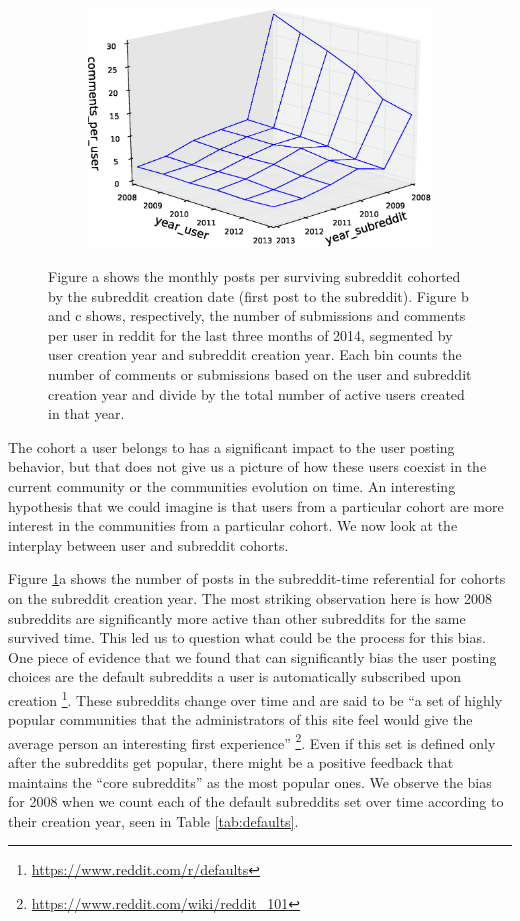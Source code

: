 \begin{figure}[!tb]
\begin{subfigure}{.3\textwidth}\includegraphics[scale=0.285]{./images/user_subreddit_comments_cohorts.eps}\caption{}\end{subfigure}
\caption{Figure a shows the monthly posts per surviving subreddit cohorted by the subreddit creation date (first post to the subreddit). Figure b and c shows, respectively, the number of submissions and comments per user in reddit for the last three months of 2014, segmented by user creation year and subreddit creation year. Each bin counts the number of comments or submissions based on the user and subreddit creation year and divide by the total number of active users created in that year.}
\label{fig:joint}
\end{figure}

The cohort a user belongs to has a significant impact to the user posting behavior, but that does not give us a picture of how these users coexist in the current community or the communities evolution on time. An interesting hypothesis that we could imagine is that users from a particular cohort are more interest in the communities from a particular cohort. We now look at the interplay between user and subreddit cohorts. 

Figure \ref{fig:joint}a shows the number of posts in the subreddit-time referential for cohorts on the subreddit creation year. The most striking observation here is how 2008 subreddits are significantly more active than other subreddits for the same survived time. This led us to question what could be the process for this bias. One piece of evidence that we found that can significantly bias the user posting choices are the default subreddits a user is automatically subscribed upon creation \footnote{\url{https://www.reddit.com/r/defaults}}. These subreddits change over time and are said to be ``a set of highly popular communities that the administrators of this site feel would give the average person an interesting first experience'' \footnote{\url{https://www.reddit.com/wiki/reddit_101}}. Even if this set is defined only after the subreddits get popular, there might be a positive feedback that maintains the ``core subreddits'' as the most popular ones. We observe the bias for 2008 when we count each of the default subreddits set over time according to their creation year, seen in Table \ref{tab:defaults}.

